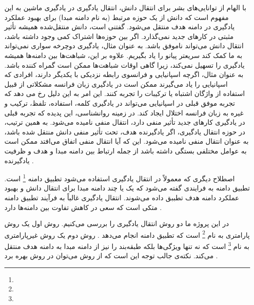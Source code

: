 {	 با الهام از توانایی‌های بشر برای انتقال دانش، انتقال یادگیری در یادگیری ماشین به این مفهوم است که دانش از یک حوزه مرتبط (به نام دامنه مبدا) برای بهبود عملکرد یادگیری در دامنه هدف منتقل می‌شود. گفتنی است، دانش منتقل‌شده همیشه تأثیر مثبتی در کارهای جدید نمی‌گذارد. اگر بین حوزه‌ها اشتراک کمی وجود داشته باشد، انتقال دانش می‌تواند ناموفق باشد. به عنوان مثال، یادگیری دوچرخه سواری نمی‌تواند به ما کمک کند سریعتر پیانو را یاد بگیریم. علاوه بر این، شباهت‌ها بین دامنه‌ها همیشه یادگیری را تسهیل نمی‌کند، زیرا گاهی اوقات شباهت‌ها ممکن است گمراه کننده باشد. به عنوان مثال‌، اگرچه اسپانیایی و فرانسوی رابطه نزدیکی با یکدیگر دارند، افرادی که اسپانیایی را یاد می‌گیرند ممکن است در یادگیری زبان فرانسه مشکلاتی از قبیل استفاده از واژگان اشتباه یا ترکیبات را تجربه کنند. این امر به این دلیل رخ می دهد که تجربه موفق قبلی در اسپانیایی می‌تواند در یادگیری کلمه، استفاده، تلفظ، ترکیب و غیره به زبان فرانسه اختلال ایجاد کند. در زمینه روانشناسی، این پدیده که تجربه قبلی در یادگیری کارهای جدید تأثیر منفی دارد، انتقال منفی نامیده می‌شود. به همین ترتیب، در حوزه انتقال یادگیری، اگر یادگیرنده هدف، تحت تأثیر منفی دانش منتقل شده باشد، به عنوان انتقال منفی نامیده می‌شود. این که آیا انتقال منفی اتفاق می‌افتد ممکن است به عوامل مختلفی بستگی داشته باشد از جمله ارتباط بین دامنه مبدا و هدف و ظرفیت یادگیرنده
	\cite{zhuang2020comprehensive}.
	
	اصطلاح دیگری که معمولاً در انتقال یادگیری استفاده می‌شود تطبیق دامنه
	 \footnote{}
	 است. تطبیق دامنه به فرایندی گفته می‌شود که یک یا چند دامنه مبدا برای انتقال دانش و بهبود عملکرد دامنه هدف تطببق داده می‌شوند. انتقال یادگیری غالباً به فرآیند تطبیق دامنه متکی است که سعی در کاهش تفاوت بین دامنه‌ها دارد
	 \cite{weiss2016survey}.
	
	در این پروژه ما دو روش انتقال یادگیری را بررسی می‌کنیم. روش اول یک روش پارامتری به نام
	\footnote{}
	 است که تطبیق دامنه انجام می‌دهد
	\cite{wang2017balanced}.
	روش دوم یک روش غیرپارامتری به نام 
	\footnote{}
	است که نه تنها ویژگی‌ها بلکه طبقه‌بند را نیز از دامنه مبدا به دامنه هدف منتقل می‌کند. نکته‌ی جالب توجه این است که از روش 
	می‌توان در روش 
	بهره برد
	\cite{wang2019easy}. 
}